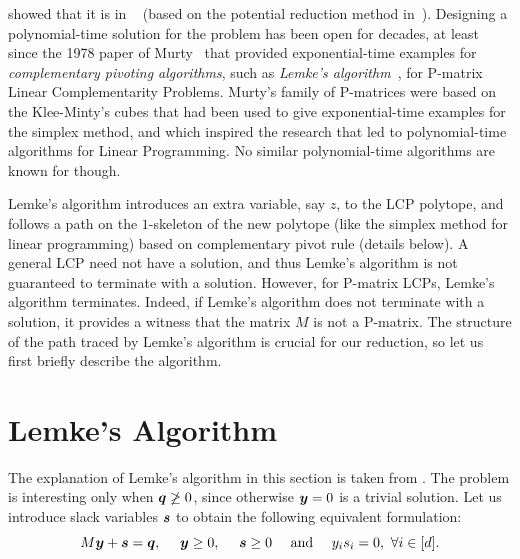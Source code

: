 showed that it is in \CLS~\cite{daskalakis2011continuous} (based on the
potential reduction method in~\cite{kojima1992interior}).  Designing a
polynomial-time solution for the \PLCP problem has been open for decades, at
least since the 1978 paper of Murty~\cite{murty1978computational} that provided
exponential-time examples for \emph{complementary pivoting algorithms}, such as 
\emph{Lemke's algorithm}~\cite{lemke1965bimatrix}, for
P-matrix Linear Complementarity Problems. Murty's family of P-matrices were
based on the Klee-Minty's cubes that had been used to give exponential-time
examples for the simplex method, and which inspired the research that led to
polynomial-time algorithms for Linear Programming. No similar polynomial-time
algorithms are known for \PLCP though.

Lemke's algorithm introduces an extra variable, say $z$, to the LCP polytope,
and follows a path on the $1$-skeleton of the new polytope (like the simplex 
method for linear programming) based
on complementary pivot rule (details below).  A general LCP need not have a
solution, and thus Lemke's algorithm is not guaranteed to terminate with a
solution.  However, for P-matrix LCPs, Lemke's algorithm terminates.  Indeed, if
Lemke's algorithm does not terminate with a solution, it provides a witness that
the matrix $M$ is not a P-matrix.  The structure of the path traced by Lemke's
algorithm is crucial for our reduction, so let us first briefly describe the
algorithm.

\section{Lemke's Algorithm}
\label{sec:lemke}

The explanation of Lemke's algorithm in this section is taken from \cite{GMSV}.
The problem is interesting only when $\mbox{\boldmath $q$} \not \geq 0$, since otherwise $\mbox{\boldmath $y$} = 0$ is a trivial solution. Let us introduce
slack variables $\mbox{\boldmath $s$}$ to obtain the following equivalent formulation:
\begin{equation} \label{eq:b} \MM \yy  + \ps = \pq, \ \ \ \  \yy \geq 0, \ \ \ \ \ps \geq 0 \ \ \ \ \mbox{and} \ \ \ \ y_is_i = 0,\ \forall i\in[d].  \end{equation}

